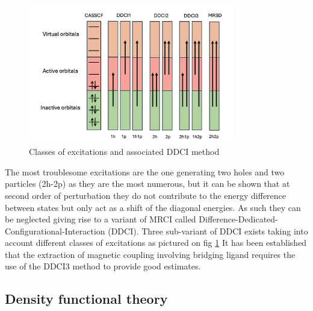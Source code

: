 \documentclass[10pt]{report}
\numberwithin{equation}{section}
\begin{document}
\begin{figure}
    \centering
    \includegraphics[width=0.8\textwidth]{Images/DDCI.png}
    \caption{Classes of excitations and associated DDCI method}
    \label{DDCI}
\end{figure}
The most troublesome excitations are the one generating two holes and two particles (2h-2p) as they are the most numerous, but it can be shown that at second order of perturbation they do not contribute to the energy difference between states but only act as a shift of the diagonal energies.
As such they can be neglected giving rise to a variant of MRCI called Difference-Dedicated-Configurational-Interaction (DDCI). 
Three sub-variant of DDCI exists taking into account different classes of excitations as pictured on fig \ref{DDCI}
It has been established that the extraction of magnetic coupling involving bridging ligand requires the use of the DDCI3 method to provide good estimates.

\subsection{Density functional theory}
\end{document}
